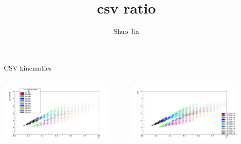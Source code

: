 \documentclass[aspectratio=169,xcolor=dvipsnames]{beamer}
\title{csv ratio}
\date{}
\author{Shuo Jia}
\begin{document}
\maketitle


\begin{frame}{CSV kinematics}
\begin{columns}
\begin{column}[T]{0.5\textwidth}
\includegraphics[width = 0.9\textwidth]{results/yield/kin_x_Q2_pos.png}
\end{column}
\begin{column}[T]{0.5\textwidth}
\includegraphics[width = 0.9\textwidth]{results/yield/kin_x_Q2_neg.png}
\end{column}
\end{columns}
\end{frame}
\end{document}
